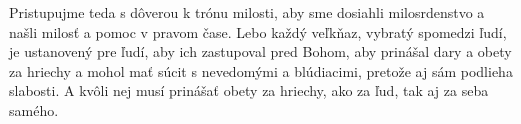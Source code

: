 Pristupujme teda s dôverou k trónu milosti, aby sme dosiahli milosrdenstvo a našli milosť a pomoc v pravom čase.
Lebo každý veľkňaz, vybratý spomedzi ľudí, je ustanovený pre ľudí, aby ich zastupoval pred Bohom, aby prinášal dary a obety za hriechy a mohol mať súcit s nevedomými a blúdiacimi, pretože aj sám podlieha slabosti. A kvôli nej musí prinášať obety za hriechy, ako za ľud, tak aj za seba samého. 